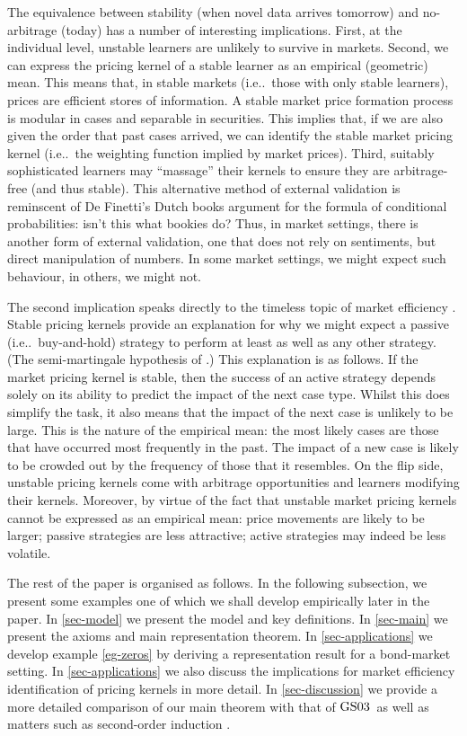\documentclass[ecta,nameyear,draft]{econsocart}
\makeatletter
\newcommand\ie{i\@.e\@ifnextchar.{}{.\@}}
\newcommand{\gsii}{$\textup{GS03}$}
\theoremstyle{plain}
\theoremstyle{remark}
\makeatother
\begin{document}
The equivalence between stability (when novel data arrives tomorrow) and
no-arbitrage (today) has a number of interesting implications. First, at the
individual level, unstable learners are unlikely to survive in markets. Second,
we can express the pricing kernel of a stable learner as an empirical
(geometric) mean. This means that, in stable markets (\ie\ those with only
stable learners), prices are efficient stores of information. A stable market
price formation process is modular in cases and separable in securities. This
implies that, if we are also given the order that past cases arrived, we can
identify the stable market pricing kernel (\ie\ the weighting function implied
by market prices). Third, suitably sophisticated learners may ``massage'' their
kernels to ensure they are arbitrage-free (and thus stable). This alternative
method of external validation is reminscent of De Finetti's Dutch books
argument for the formula of conditional probabilities: isn't this what bookies
do? Thus, in market settings, there is another form of external validation, one
that does not rely on sentiments, but direct manipulation of numbers. In some
market settings, we might expect such behaviour, in others, we might not.

The second implication speaks directly to the timeless topic of market
efficiency \citet{fama1970efficient,malkiel2003efficient}.  Stable pricing
kernels provide an explanation for why we might expect a passive (\ie\
buy-and-hold) strategy to perform at least as well as any other strategy.  (The
semi-martingale hypothesis of \citet{fama1970efficient}.) This explanation is
as follows. If the market pricing kernel is stable, then the success of an
active strategy depends solely on its ability to predict the impact of the next
case type.  Whilst this does simplify the task, it also means that the impact
of the next case is unlikely to be large. This is the nature of the empirical
mean: the most likely cases are those that have occurred most frequently in the
past. The impact of a new case is likely to be crowded out by the frequency of
those that it resembles.  On the flip side, unstable pricing kernels come with
arbitrage opportunities and learners modifying their kernels.  Moreover, by
virtue of the fact that unstable market pricing kernels cannot be expressed as
an empirical mean: price movements are likely to be larger; passive strategies
are less attractive; active strategies may indeed be less volatile.

The rest of the paper is organised as follows. In the following subsection, we
present some examples one of which we shall develop empirically later in the
paper. In \cref{sec-model} we present the model and key definitions. In
\cref{sec-main} we present the axioms and main representation theorem. In
\cref{sec-applications} we develop example \cref{eg-zeros} by deriving a
representation result for a bond-market setting. In \cref{sec-applications} we
also discuss the implications for market efficiency identification of pricing
kernels in more detail. In \cref{sec-discussion} we provide a more detailed
comparison of our main theorem with that of \gsii\ as well as matters such as
second-order induction \citep{argenziano2019second}.
\end{document}
